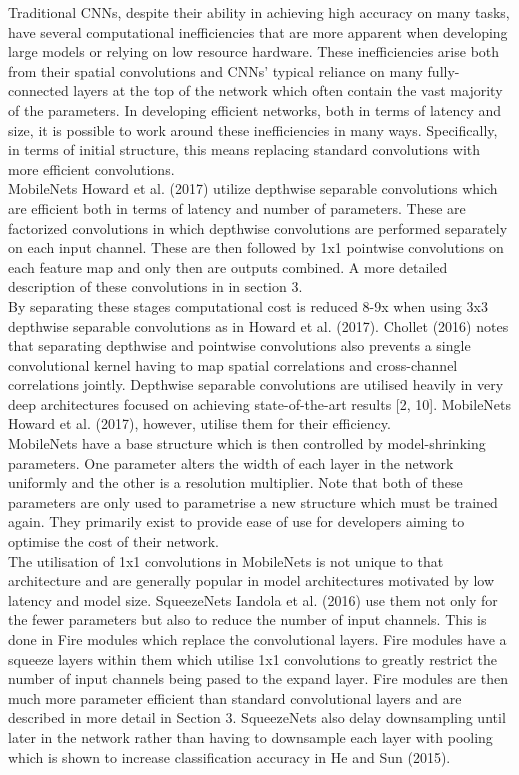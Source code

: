 \documentclass{article}
\begin{document}
Traditional CNNs, despite their ability in achieving high accuracy on many tasks, have several computational inefficiencies that are more apparent when developing large models or relying on low resource hardware. These inefficiencies  arise both from their spatial convolutions and CNNs' typical reliance on many fully-connected layers at the top of the network which often contain the vast majority of the parameters. In developing efficient networks, both in terms of latency and size, it is possible to work around these inefficiencies in many ways. Specifically, in terms of initial structure, this means replacing standard convolutions with more efficient convolutions.\\

MobileNets Howard et al. (2017) utilize depthwise separable convolutions which are efficient both in terms of latency  and number of parameters. These are factorized convolutions in which depthwise convolutions are performed separately on each input channel. These are then followed by 1x1 pointwise convolutions on each feature map and only then are outputs combined. A more detailed description of these convolutions in in section 3.\\ 

By separating these stages computational cost is reduced 8-9x when using 3x3 depthwise separable convolutions as in Howard et al. (2017). Chollet (2016) notes that separating depthwise and pointwise convolutions also prevents a single convolutional kernel having to map spatial correlations and cross-channel correlations jointly. Depthwise separable convolutions are utilised heavily in very deep architectures focused on achieving state-of-the-art results [2, 10]. MobileNets Howard et al. (2017), however, utilise them for their efficiency. \\

MobileNets have a base structure which is then controlled by model-shrinking parameters. One parameter alters the width of each layer in the network uniformly and the other is a resolution multiplier. Note that both of these parameters are only used to parametrise a new structure which must be trained again. They primarily exist to provide ease of use for developers aiming to optimise the cost of their network.\\

The utilisation of 1x1 convolutions in MobileNets is not unique to that architecture and are generally popular in model architectures motivated by low latency and model size. SqueezeNets Iandola et al. (2016) use them not only for the fewer parameters but also to reduce the number of input channels. This is done in Fire modules which replace the convolutional layers. Fire modules have a squeeze layers within them which utilise 1x1 convolutions to greatly restrict the number of input channels being pased to the expand layer. Fire modules are then much more parameter efficient than standard convolutional layers and are described in more detail in Section 3. SqueezeNets also delay downsampling until later in the network rather than having to downsample each layer with pooling which is shown to increase classification accuracy in He and Sun (2015).\\
\end{document}

